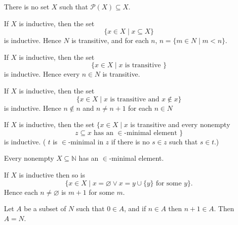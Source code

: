 \documentclass{ctexart}
\theoremstyle{remark}
\newtheorem{prob}{\begin{tikzpicture}[baseline]%
\node at (-0.02em,0.3em) {$\mathbb{P}$};%
\node[scale=0.7] at (0.2em,-0.0em) {R};%
\node[scale=0.7] at (0.6em,0.4em) {O};%
\node[scale=0.8] at (1.05em,0.25em) {B};%
\node at (1.55em,0.3em) {L};%
\node[scale=0.7] at (1.75em,0.45em) {E};%
\node at (2.35em,0.3em) {M};%
\end{tikzpicture}}
\newenvironment{problem}{\color{blue}\begin{prob}}{\end{prob}}
\newcommand\<{\langle}
\renewcommand\>{\rangle}
\newcommand\N{\mathbb{N}}
\begin{document}
\begin{problem}
There is no set $X$ such that $\mathscr{P}(X) \subseteq X$.
\end{problem}
\begin{problem}
If $X$ is inductive, then the set
$$
\{x \in X \mid x \subseteq X\}
$$
is inductive. Hence $N$ is transitive, and for each $n$, $n=\{m \in N \mid m<n\}$.
\end{problem}
\begin{problem}
If $X$ is inductive, then the set
$$
\{x \in X \mid x \text { is transitive }\}
$$
is inductive. Hence every $n \in N$ is transitive.
\end{problem}

\begin{problem}
If $X$ is inductive, then the set
$$
\{x \in X \mid x \text { is transitive and } x \notin x\}
$$
is inductive. Hence $n \notin n$ and $n \neq n+1$ for each $n \in N$
\end{problem}

\begin{problem}\label{pro:7}
If $X$ is inductive, then the set
$\{x \in X \mid x$ is transitive and every nonempty
$$
z \subseteq x \text { has an } \in \text {-minimal element }\}
$$
is inductive.
( $t$ is $\in$-minimal in $z$ if there is no $s \in z$ such that $s \in t$.)
\end{problem}

\begin{problem}
Every nonempty $X \subseteq \N$ has an $\in$-minimal element.
\end{problem}

\begin{problem}
If $X$ is inductive then so is
$$
\{x \in X \mid x=\varnothing \vee x=y \cup\{y\} \text { for some } y\}. 
$$
Hence each $n \neq \varnothing$ is $m+1$ for some $m$.
\end{problem}

\begin{problem}
Let $A$ be a subset of $N$ such that $0 \in A$, and if $n \in A$ then $n+1 \in A$. Then $A=N$. 
\end{problem}
\end{document}
